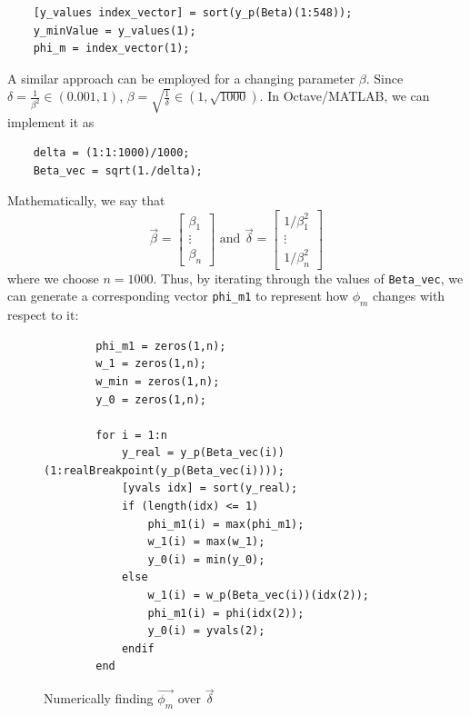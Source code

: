 \documentclass[11pt]{article}
\begin{document}
\begin{verbatim}
    [y_values index_vector] = sort(y_p(Beta)(1:548));
    y_minValue = y_values(1);
    phi_m = index_vector(1);
\end{verbatim}

A similar approach can be employed for a changing parameter $\beta$. 
Since $\delta=\frac{1}{\beta^2}\in (0.001,1)$, $\beta=\sqrt{\frac{1}{\delta}}\in (1,\sqrt{1000})$.
In Octave/MATLAB, we can implement it as

\begin{verbatim}
    delta = (1:1:1000)/1000;
    Beta_vec = sqrt(1./delta);
\end{verbatim}

Mathematically, we say that 
\begin{equation}
\vec\beta=\begin{bmatrix}\beta_1\\\vdots\\\beta_n\end{bmatrix}\text{ and }\vec{\delta}=\begin{bmatrix}1/\beta_1^2\\\vdots\\1/\beta_n^2\end{bmatrix}
\label{paravectors}
\end{equation}
where we choose $n=1000$.
Thus, by iterating through the values of \verb|Beta_vec|, we can generate a corresponding vector \verb|phi_m1| to represent how $\phi_m$ changes with respect to it:

\begin{figure}[H]
    \begin{verbatim}
        phi_m1 = zeros(1,n);
        w_1 = zeros(1,n);
        w_min = zeros(1,n);
        y_0 = zeros(1,n);
    
        for i = 1:n
            y_real = y_p(Beta_vec(i))(1:realBreakpoint(y_p(Beta_vec(i))));
            [yvals idx] = sort(y_real);
            if (length(idx) <= 1)
                phi_m1(i) = max(phi_m1);
                w_1(i) = max(w_1);
                y_0(i) = min(y_0);
            else
                w_1(i) = w_p(Beta_vec(i))(idx(2));
                phi_m1(i) = phi(idx(2));
                y_0(i) = yvals(2);
            endif
        end
    \end{verbatim}
    \caption{Numerically finding $\vec{\phi_m}$ over $\vec{\delta}$}\label{loop1}
\end{figure}
\end{document}
